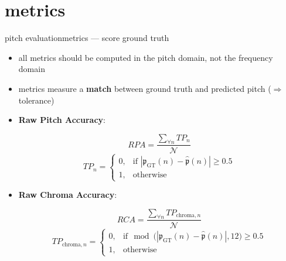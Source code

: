    \section{metrics}
       \begin{frame}{pitch evaluation}{metrics --- score ground truth}
            \vspace{-2mm}
            \begin{itemize}
                \item   all metrics should be computed in the pitch domain, not the frequency domain
                \item   metrics measure a \textbf{match} between ground truth and predicted pitch ($\Rightarrow$ tolerance)
                \bigskip
                \item<2->   \textbf{Raw Pitch Accuracy}:
                \begin{footnotesize}
                \begin{equation*}
                     RPA = \frac{\sum\limits_{\forall n}TP_n}{\mathcal{N}}  
                \end{equation*}
                \[ TP_n = \left\{ 
								\begin{array}{ll} 
									0, & \text{if } |\mathfrak{p}_\mathrm{GT}(n) - \hat{\mathfrak{p}}(n)| \geq 0.5 \\
									1, & \text{otherwise }
			          			\end{array} 
			          			\right. \] 
                \end{footnotesize}
                \smallskip
                \item<2->   \textbf{Raw Chroma Accuracy}:
                \begin{footnotesize}
                \begin{equation*}
                     RCA = \frac{\sum\limits_{\forall n}TP_{\mathrm{chroma},n}}{\mathcal{N}}  
                \end{equation*}
                \[ TP_{\mathrm{chroma},n} = \left\{ 
								\begin{array}{ll} 
									0, & \text{if} \mod\big(|\mathfrak{p}_\mathrm{GT}(n) - \hat{\mathfrak{p}}(n)|, 12\big) \geq 0.5 \\
									1, & \text{otherwise }
			          			\end{array} 
			          			\right. \]
                \end{footnotesize}
            \end{itemize}
       \end{frame}
